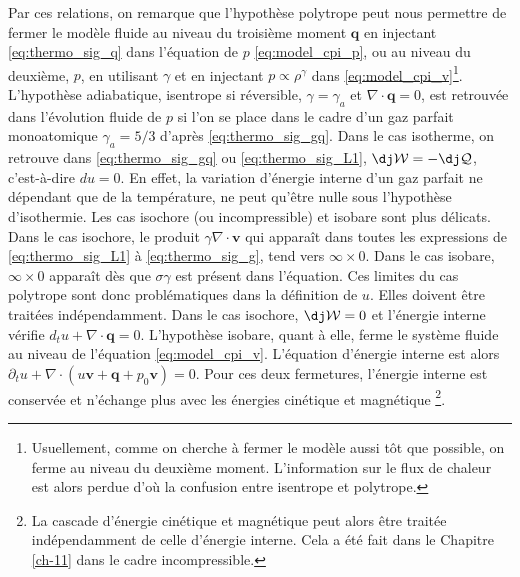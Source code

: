 Par ces relations, on remarque que l'hypothèse polytrope peut nous permettre de fermer le modèle fluide au niveau du troisième moment $\boldsymbol{q}$ en injectant \eqref{eq:thermo_sig_q} dans l'équation de $p$ \eqref{eq:model_cpi_p}, ou au niveau du deuxième, $p$, en utilisant $\gamma$ et en injectant $p \propto \rho^{\gamma}$ dans \eqref{eq:model_cpi_v}\footnote{Usuellement, comme on cherche à fermer le modèle aussi tôt que possible, on ferme au niveau du deuxième moment. L'information sur le flux de chaleur est alors perdue d'où la confusion entre isentrope et polytrope.}. L'hypothèse adiabatique, isentrope si réversible, $\gamma=\gamma_a$ et $\nabla \cdot \boldsymbol{q}=0$, est retrouvée dans l'évolution fluide de $p$ si l'on se place dans le cadre d'un gaz parfait monoatomique $\gamma_a = 5/3$ d'après \eqref{eq:thermo_sig_gq}. Dans le cas isotherme, on retrouve dans \eqref{eq:thermo_sig_gq} ou \eqref{eq:thermo_sig_L1}, $\dj \mathcal{W} = - \dj \mathcal{Q}$, c'est-à-dire $du = 0$. En effet, la variation d'énergie interne d'un gaz parfait ne dépendant que de la température, ne peut qu'être nulle sous l'hypothèse d'isothermie. Les cas isochore (ou incompressible) et isobare sont plus délicats. Dans le cas isochore, le produit $\gamma \nabla \cdot \boldsymbol{v}$ qui apparaît dans toutes les expressions de \eqref{eq:thermo_sig_L1} à \eqref{eq:thermo_sig_g}, tend vers $\infty \times 0$. Dans le cas isobare, $\infty \times 0$ apparaît dès que $\sigma \gamma$ est présent dans l'équation. Ces limites du cas polytrope sont donc problématiques dans la définition de $u$. Elles doivent être traitées indépendamment. Dans le cas isochore, $\dj \mathcal{W} = 0$ et l'énergie interne vérifie $d_t u + \nabla \cdot \boldsymbol{q} = 0 $. L'hypothèse isobare, quant à elle, ferme le système fluide au niveau de l'équation \eqref{eq:model_cpi_v}. L'équation d'énergie interne est alors  $\partial_t u + \nabla \cdot \left(u \boldsymbol{v} + \boldsymbol{q} + p_0 \boldsymbol{v}\right) = 0 $. Pour ces deux fermetures, l'énergie interne est conservée et n'échange plus avec les énergies cinétique et magnétique \footnote{La cascade d'énergie cinétique et magnétique peut alors être traitée indépendamment de celle d'énergie interne.  Cela a été fait dans le Chapitre \ref{ch-11} dans le cadre incompressible.}.

